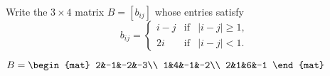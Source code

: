 \begin{Exercise}[
name={},
title={}, 
difficulty=1,
origin={\cite{MB}}]
Write the $3 \times 4$ matrix $B=[b_{ij}]$ whose entries satisfy 
\[ b_{ij} = \left\lbrace
								\begin{array}{lll}
											i-j & \mathrm{if} & |i-j|\geq1,\\
											2i    & \mathrm{if} & |i-j|< 1. 
								\end{array}\right. 
\]
\end{Exercise}

\begin{Answer}
$B=\begin{mat} 2&-1&-2&-3\\  1&4&-1&-2\\  2&1&6&-1 \end{mat}$
\end{Answer}
